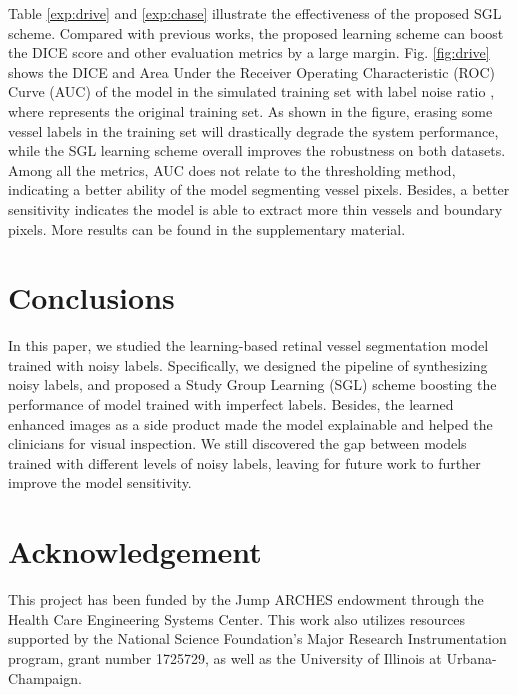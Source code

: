 \documentclass[runningheads]{llncs}
\begin{document}
Table \ref{exp:drive} and \ref{exp:chase} illustrate the effectiveness of the proposed SGL scheme. Compared with previous works, the proposed learning scheme can boost the DICE score \cite{sorensen1948method} and other evaluation metrics by a large margin. Fig. \ref{fig:drive} shows the DICE and Area Under the Receiver Operating Characteristic (ROC) Curve (AUC) of the model in the simulated training set with label noise ratio , where  represents the original training set. As shown in the figure, erasing some vessel labels in the training set will drastically degrade the system performance, while the SGL learning scheme overall improves the robustness on both datasets. Among all the metrics, AUC does not relate to the thresholding method, indicating a better ability of the model segmenting vessel pixels. Besides, a better sensitivity indicates the model is able to extract more thin vessels and boundary pixels. More results can be found in the supplementary material.

\section{Conclusions}
In this paper, we studied the learning-based retinal vessel segmentation model trained with noisy labels. Specifically, we designed the pipeline of synthesizing noisy labels, and proposed a Study Group Learning (SGL) scheme boosting the performance of model trained with imperfect labels. Besides, the learned enhanced images as a side product made the model explainable and helped the clinicians for visual inspection. We still discovered the gap between models trained with different levels of noisy labels, leaving for future work to further improve the model sensitivity.

\section{Acknowledgement}
This project has been funded by the Jump ARCHES endowment through the Health Care Engineering Systems Center. This work also utilizes resources supported by the National Science Foundation’s Major Research Instrumentation program, grant number 1725729, as well as the University of Illinois at Urbana-Champaign.
\end{document}

